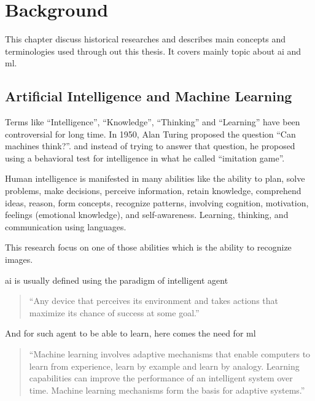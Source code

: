 \chapter{Background}

This chapter discuss historical researches and describes main concepts and terminologies used through out this thesis.
It covers mainly topic about \gls{ai} and \gls{ml}.

\section{Artificial Intelligence and Machine Learning}


Terms like ``Intelligence'', ``Knowledge'', ``Thinking'' and ``Learning''
have been controversial for long time. In 1950, Alan Turing proposed the question ``Can machines think?''\autocite{machinery1950computing}.
and instead of trying to answer that question, he proposed using a behavioral test for intelligence in what he called ``imitation game''.

Human intelligence is manifested in many abilities like the ability to plan, solve problems, make decisions,
perceive information, retain knowledge, comprehend ideas, reason, form concepts, recognize patterns,
involving cognition, motivation, feelings (emotional knowledge), and self-awareness.
Learning, thinking, and communication using languages.

This research focus on one of those abilities which is the ability to recognize images.

\gls{ai} is usually defined using the paradigm of intelligent agent

\begin{quote}
``Any device that perceives its environment and takes actions that maximize its chance of success at some goal.'' \autocite{russell2003artificial}
\end{quote}

And for such agent to be able to learn, here comes the need for \gls{ml}

\begin{quote}
``Machine learning involves adaptive mechanisms that enable computers
to learn from experience, learn by example and learn by analogy.
Learning capabilities can improve the performance of an intelligent system over
time. Machine learning mechanisms form the basis for adaptive systems.''\autocite{michael2005artificial}
\end{quote}

